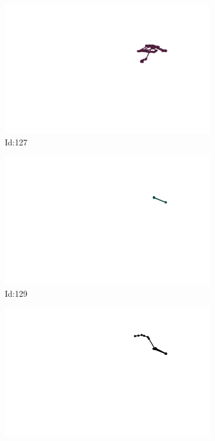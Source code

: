 \documentclass[12pt,twoside]{report}
\begin{document}
\begin{figure}
\centering
\begin{subfigure}[b]{0.20\textwidth}
\centering
\includegraphics[width=\textwidth]{../../trajectories/127.png}
\caption{Id:127}
\end{subfigure}
\begin{subfigure}[b]{0.20\textwidth}
\centering
\includegraphics[width=\textwidth]{../../trajectories/129.png}
\caption{Id:129}
\end{subfigure}
\begin{subfigure}[b]{0.20\textwidth}
\centering
\includegraphics[width=\textwidth]{../../trajectories/133.png}

\end{subfigure}
\end{figure}
\end{document}
